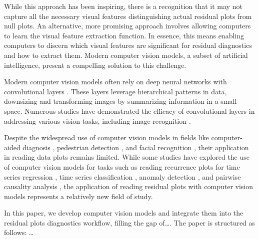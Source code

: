 \documentclass[]{interact}
\theoremstyle{plain}%
\theoremstyle{definition}
\theoremstyle{remark}
\begin{document}
While this approach has been inspiring, there is a recognition that it
may not capture all the necessary visual features distinguishing actual
residual plots from null plots. An alternative, more promising approach
involves allowing computers to learn the visual feature extraction
function. In essence, this means enabling computers to discern which
visual features are significant for residual diagnostics and how to
extract them. Modern computer vision models, a subset of artificial
intelligence, present a compelling solution to this challenge.

Modern computer vision models often rely on deep neural networks with
convolutional layers \citep{fukushima1982neocognitron}. These layers
leverage hierarchical patterns in data, downsizing and transforming
images by summarizing information in a small space. Numerous studies
have demonstrated the efficacy of convolutional layers in addressing
various vision tasks, including image recognition \citep{rawat2017deep}.

Despite the widespread use of computer vision models in fields like
computer-aided diagnosis \citep{lee2015image}, pedestrian detection
\citep{brunetti2018computer}, and facial recognition
\citep{emami2012facial}, their application in reading data plots remains
limited. While some studies have explored the use of computer vision
models for tasks such as reading recurrence plots for time series
regression \citep{ojeda2020multivariate}, time series classification
\citep{chu2019automatic, hailesilassie2019financial, hatami2018classification, zhang2020encoding},
anomaly detection \citep{chen2020convolutional}, and pairwise causality
analysis \citep{singh2017deep}, the application of reading residual
plots with computer vision models represents a relatively new field of
study.

In this paper, we develop computer vision models and integrate them into
the residual plots diagnostics workflow, filling the gap of\ldots. The
paper is structured as follows: \ldots{}
\end{document}
